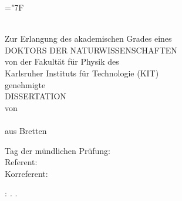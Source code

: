 \documentclass[
twoside,
openright,
titlepage,
numbers=noenddot,
headinclude,
fleqn,
a4paper,
footinclude=true,
cleardoublepage=empty,
abstractoff,
BCOR=5mm,
paper=a4,
fontsize=11pt,
british,ngerman,american,
]{scrreprt}
\begin{document}
                    
\let\hbar=\hslash
\def\hyph{-\penalty0\hskip0pt\relax}
\hyphenchar\font=\string"7F
\frenchspacing
\raggedbottom
{} %
\pagestyle{plain}
\thispagestyle{empty}
\begin{titlepage}
  \begin{addmargin}[-1cm]{-3cm}
    \begin{center}
        \Large
        \hfill
        \vfill
        \begingroup
            \spacedallcaps{{\myTitleGerman}} \\ %
        \endgroup
        \vfill
        Zur Erlangung des akademischen Grades eines \\
        \medskip
        DOKTORS DER NATURWISSENSCHAFTEN \\
        \medskip
        von der Fakultät für Physik des \\
        \medskip
        Karlsruher Instituts für Technologie (KIT)\\
        \vfill
        genehmigte \\
        \vfill
        DISSERTATION \\
        \vfill
        \medskip
        von  \\
        \vfill
        \myDegree \myName \\ %
        \medskip
        aus Bretten \\
        \vfill
    \end{center}
    \hfill
    \vfill
    \noindent\bigskip
    Tag der mündlichen Prüfung: \myTime \\
    \bigskip
    Referent: \myProf \\
    \bigskip
    Korreferent: \mySupervisor
  \end{addmargin}       
\end{titlepage}   
\thispagestyle{empty}
\hfill
\vfill
\noindent\myName: \textit{\myTitleGerman.} \myTitle. %
\textcopyright\, \myTime
\cleardoublepage
\end{document}
